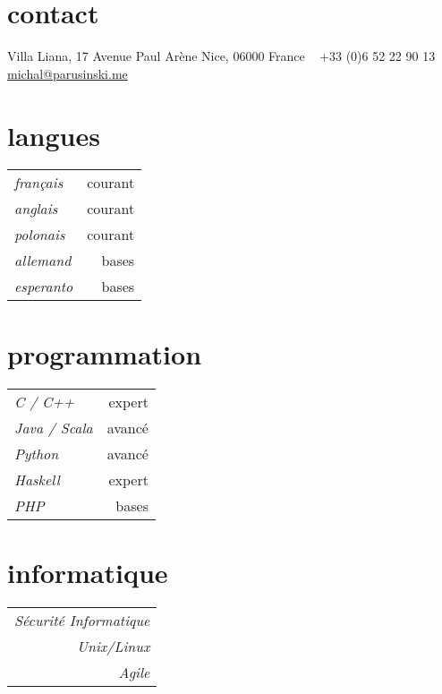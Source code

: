 \documentclass[]{friggeri-cv} %
\begin{document}


\begin{aside} %
\section{contact}
Villa Liana,
17 Avenue Paul Arène
Nice, 06000
France
~
+33 (0)6 52 22 90 13
~
\href{mailto:michal@parusinski.me}{michal@parusinski.me}
\section{langues}
    {\def\arraystretch{0.3}%
    \begin{tabular}{l r}
        \emph{français} & courant \\
        \emph{anglais} & courant \\
        \emph{polonais} & courant \\
        \emph{allemand} & bases \\
        \emph{esperanto} & bases \\
    \end{tabular}%
    }
\section{programmation}
    {\def\arraystretch{0.3}%
    \begin{tabular}{l r}
        \emph{C / C++} & expert \\
        \emph{Java / Scala  } & avancé \\
        \emph{Python} & avancé \\
        \emph{Haskell} & expert \\
        \emph{PHP} & bases \\
    \end{tabular}%
    }
\section{informatique}
    {\def\arraystretch{0.3}%
    \begin{tabular}{ r }
        \emph{Sécurité Informatique} \\
        \emph{Unix/Linux} \\
        \emph{Agile} \\
    \end{tabular}%
    }
\end{aside}
\end{document}
